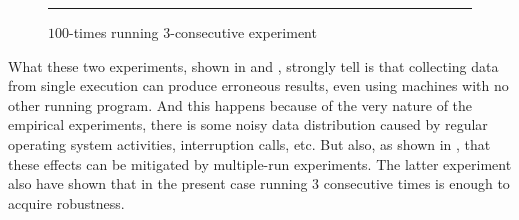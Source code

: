 \begin{figure}
  \centering
  \begin{minipage}[t]{\linewidth}
    \vspace{1em}
    \hrule
    \vspace{1em}
  \end{minipage}
  \caption{$100$-times running $3$-consecutive experiment}
  \label{fig:CProbust}
\end{figure}

What these two experiments, shown in  and , strongly tell is that collecting data from single execution can produce erroneous results, even using machines with no other running program. And this happens because of the very nature of the empirical experiments, there is some noisy data distribution caused by regular operating system activities, interruption calls, etc. But also, as shown in , that these effects can be mitigated by multiple-run experiments. The latter experiment also have shown that in the present case running $3$ consecutive times is enough to acquire robustness.

